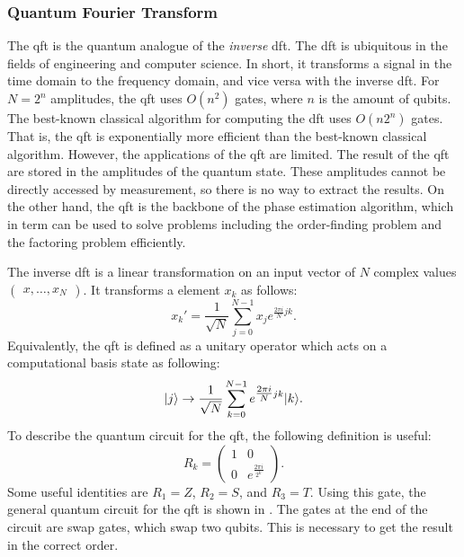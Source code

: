 \subsubsection{Quantum Fourier Transform}
The \gls{qft} is the quantum analogue of the \emph{inverse} \gls{dft}.
The \gls{dft} is ubiquitous in the fields of engineering and computer science.
In short, it transforms a signal in the time domain to the frequency domain, and vice versa with the inverse \gls{dft}.
For $N = 2^n$ amplitudes, the \gls{qft} uses $O(n^2)$ gates, where $n$ is the amount of qubits.
The best-known classical algorithm for computing the \gls{dft} uses $O(n2^n)$ gates.
That is, the \gls{qft} is exponentially more efficient than the best-known classical algorithm.
However, the applications of the \gls{qft} are limited.
The result of the \gls{qft} are stored in the amplitudes of the quantum state.
These amplitudes cannot be directly accessed by measurement, so there is no way to extract the results.
On the other hand, the \gls{qft} is the backbone of the phase estimation algorithm, which in term can be used to solve problems including the order-finding problem and the factoring problem efficiently.

The inverse \gls{dft} is a linear transformation on an input vector of $N$ complex values $(\begin{matrix}x,\ldots,x_N\end{matrix})$.
It transforms a element $x_k$ as follows:
\begin{equation}
x_k' = \dfrac{1}{\sqrt{N}} \sum_{j=0}^{N-1} x_j e^{\tfrac{2\pi i}{N}jk}.
\end{equation}
Equivalently, the \gls{qft} is defined as a unitary operator which acts on a computational basis state  as following:
\begin{equation}
\vert{j}\rangle \rightarrow \dfrac{1}{\sqrt N}\sum_{k=0}^{N-1}e^{\tfrac{2\pi i}{N} jk}\vert{k}\rangle.
\end{equation}
To describe the quantum circuit for the \gls{qft}, the following definition is useful:
\begin{equation}
R_k = \begin{pmatrix}
1 & 0 \\
0 & e^{\tfrac{2\pi i}{2^k}}
\end{pmatrix}.
\end{equation}
Some useful identities are $R_1 = Z$, $R_2 = S$, and $R_3 = T$.
Using this gate, the general quantum circuit for the \gls{qft} is shown in .
The gates at the end of the circuit are swap gates, which swap two qubits.
This is necessary to get the result in the correct order.

